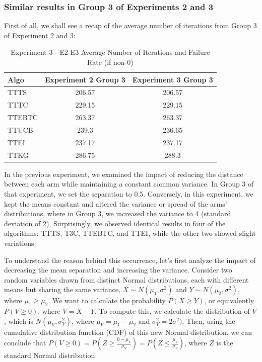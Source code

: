 \documentclass[a4paper, 12pt]{article}
\theoremstyle{definition}
\begin{document}
\subsubsection{Similar results in Group 3 of Experiments 2 and 3}

First of all, we shall see a recap of the average number of iterations from Group 3 of Experiment 2 and 3:

\begin{table}[hbt!]
\centering
\begin{tabular}{lcc}
\hline
Algo & Experiment 2 Group 3 & Experiment 3 Group 3 \\
\hline
TTTS & 206.57 & 206.57\\
TTTC & 229.15 & 229.15\\
TTEBTC & 263.37 & 263.37\\
TTUCB & 239.3 & 236.65\\
TTEI & 237.17& 237.17\\
TTKG & 286.75 & 288.3\\
\hline
\end{tabular}
\caption{Experiment 3 - E2 E3 Average Number of Iterations and Failure Rate (if non-0)}
\label{table:exp3_iter_e2e3}
\end{table}

In the previous experiment, we examined the impact of reducing the distance between each arm while maintaining a constant common variance. In Group 3 of that experiment, we set the separation to 0.5. Conversely, in this experiment, we kept the means constant and altered the variance or spread of the arms' distributions, where in Group 3, we increased the variance to 4 (standard deviation of 2). Surprisingly, we observed identical results in four of the algorithms: TTTS, T3C, TTEBTC, and TTEI, while the other two showed slight variations. 

To understand the reason behind this occurrence, let's first analyze the impact of decreasing the mean separation and increasing the variance. Consider two random variables drawn from distinct Normal distributions, each with different means but sharing the same variance, $X \sim N(\mu_1, \sigma^2)$ and $Y \sim N(\mu_2, \sigma^2)$, where $\mu_1\geq\mu_2$. We want to calculate the probability $P(X \geq Y)$, or equivalently $P(V \geq 0)$, where $V = X-Y$. To compute this, we calculate the distribution of $V$, which is $N(\mu_V, \sigma^2_V)$, where $\mu_V = \mu_1-\mu_2$ and $\sigma^2_V = 2\sigma^2)$. Then, using the cumulative distribution function (CDF) of this new Normal distribution, we can conclude that $P(V \geq 0) = P(Z \geq \frac{0-\mu_V}{\sigma_V}) = P(Z \leq \frac{\mu_V}{\sigma_V})$, where $Z$ is the standard Normal distribution.
\end{document}
